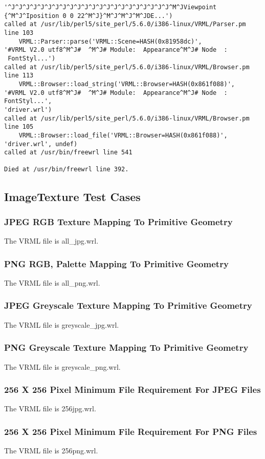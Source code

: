 \documentclass[12pt,letterpaper]{article}
\newcommand{\ITA}{JPEG RGB Texture Mapping To Primitive Geometry}
\newcommand{\ITB}{PNG RGB, Palette Mapping To Primitive Geometry}
\newcommand{\ITC}{JPEG Greyscale Texture Mapping To Primitive Geometry}
\newcommand{\ITD}{PNG Greyscale Texture Mapping To Primitive Geometry}
\newcommand{\ITE}{256 X 256 Pixel Minimum File Requirement For JPEG Files}
\newcommand{\ITF}{256 X 256 Pixel Minimum File Requirement For PNG Files}
\begin{document}
\begin{verbatim}
'^J^J^J^J^J^J^J^J^J^J^J^J^J^J^J^J^J^J^J^J^J^J^M^JViewpoint
{^M^J^Iposition 0 0 22^M^J}^M^J^M^J^M^JDE...')
called at /usr/lib/perl5/site_perl/5.6.0/i386-linux/VRML/Parser.pm
line 103
	VRML::Parser::parse('VRML::Scene=HASH(0x81958dc)',
'#VRML V2.0 utf8^M^J#  ^M^J# Module:  Appearance^M^J# Node  :
 FontStyl...')
called at /usr/lib/perl5/site_perl/5.6.0/i386-linux/VRML/Browser.pm
line 113
	VRML::Browser::load_string('VRML::Browser=HASH(0x861f088)',
'#VRML V2.0 utf8^M^J#  ^M^J# Module:  Appearance^M^J# Node  :
FontStyl...',
'driver.wrl')
called at /usr/lib/perl5/site_perl/5.6.0/i386-linux/VRML/Browser.pm
line 105
	VRML::Browser::load_file('VRML::Browser=HASH(0x861f088)',
'driver.wrl', undef)
called at /usr/bin/freewrl line 541

Died at /usr/bin/freewrl line 392.

\end{verbatim}

\subsection{ImageTexture Test Cases}

\subsubsection{\ITA}
\label{sec:jpeg-rgb}
The VRML file is all\_jpg.wrl.

\subsubsection{\ITB}
The VRML file is all\_png.wrl.

\subsubsection{\ITC}
The VRML file is greyscale\_jpg.wrl.

\subsubsection{\ITD}
The VRML file is greyscale\_png.wrl.

\subsubsection{\ITE}
The VRML file is 256jpg.wrl.

\subsubsection{\ITF}
The VRML file is 256png.wrl.
\end{document}
